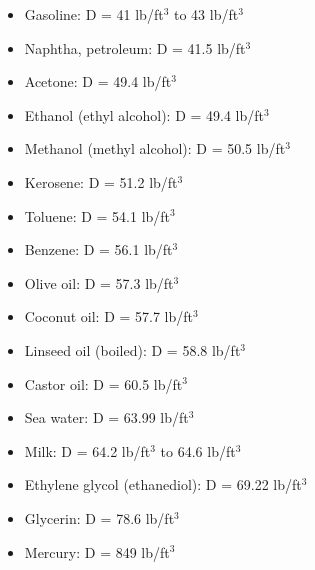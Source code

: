 


\begin{itemize}
\item{} Gasoline: D = 41 lb/ft$^{3}$ to 43 lb/ft$^{3}$
\item{} Naphtha, petroleum: D = 41.5 lb/ft$^{3}$
\item{} Acetone: D = 49.4 lb/ft$^{3}$
\item{} Ethanol (ethyl alcohol): D = 49.4 lb/ft$^{3}$
\item{} Methanol (methyl alcohol): D = 50.5 lb/ft$^{3}$
\item{} Kerosene: D = 51.2 lb/ft$^{3}$
\item{} Toluene: D = 54.1 lb/ft$^{3}$
\item{} Benzene: D = 56.1 lb/ft$^{3}$
\item{} Olive oil: D = 57.3 lb/ft$^{3}$
\item{} Coconut oil: D = 57.7 lb/ft$^{3}$
\item{} Linseed oil (boiled): D = 58.8 lb/ft$^{3}$
\item{} Castor oil: D = 60.5 lb/ft$^{3}$
\item{} Sea water: D = 63.99 lb/ft$^{3}$
\item{} Milk: D = 64.2 lb/ft$^{3}$ to 64.6 lb/ft$^{3}$
\item{} Ethylene glycol (ethanediol): D = 69.22 lb/ft$^{3}$
\item{} Glycerin: D = 78.6 lb/ft$^{3}$
\item{} Mercury: D = 849 lb/ft$^{3}$
\end{itemize}

\vskip 20pt


